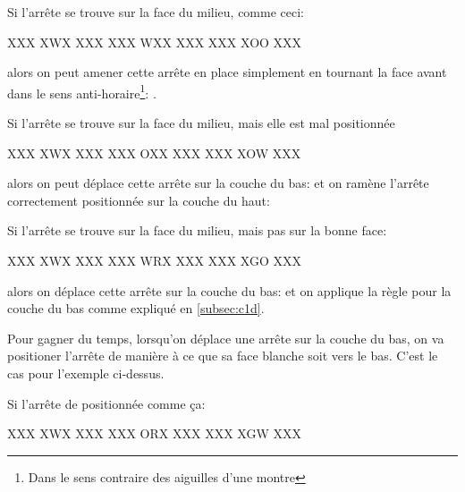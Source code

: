 \documentclass[10pt,paper=a5,pagesize]{scrbook}
\begin{document}
Si l'arrête se trouve sur la face du milieu, comme ceci:

\begin{center}
	\RubikFaceUp%
	{X}{X}{X}%
	{X}{W}{X}%
	{X}{X}{X}
	\RubikFaceRight%
	{X}{X}{X}%
	{W}{X}{X}%
	{X}{X}{X}
	\RubikFaceFront%
	{X}{X}{X}%
	{X}{O}{O}%
	{X}{X}{X}
\end{center}

alors on peut amener cette arrête en place simplement en tournant la face avant dans le sens anti-horaire\footnote{Dans le sens contraire des aiguilles d'une montre}: .

Si l'arrête se trouve sur la face du milieu, mais elle est mal positionnée

\begin{center}
	\RubikFaceUp%
	{X}{X}{X}%
	{X}{W}{X}%
	{X}{X}{X}
	\RubikFaceRight%
	{X}{X}{X}%
	{O}{X}{X}%
	{X}{X}{X}
	\RubikFaceFront%
	{X}{X}{X}%
	{X}{O}{W}%
	{X}{X}{X}
\end{center}

alors on peut déplace cette arrête sur la couche du bas:  et on ramène l'arrête correctement positionnée sur la couche du haut: 


Si l'arrête se trouve sur la face du milieu, mais pas sur la bonne face:

\begin{center}
	\RubikFaceUp%
	{X}{X}{X}%
	{X}{W}{X}%
	{X}{X}{X}
	\RubikFaceRight%
	{X}{X}{X}%
	{W}{R}{X}%
	{X}{X}{X}
	\RubikFaceFront%
	{X}{X}{X}%
	{X}{G}{O}%
	{X}{X}{X}
\end{center}

alors on déplace cette arrête sur la couche du bas:  et on applique la règle pour la couche du bas comme expliqué en \ref{subsec:c1d}.


Pour gagner du temps, lorsqu'on déplace une arrête sur la couche du bas, on va positioner l'arrête de manière à ce que sa face blanche soit vers le bas. C'est le cas pour l'exemple ci-dessus.

Si l'arrête de positionnée comme ça:

\begin{center}
	\RubikFaceUp%
	{X}{X}{X}%
	{X}{W}{X}%
	{X}{X}{X}
	\RubikFaceRight%
	{X}{X}{X}%
	{O}{R}{X}%
	{X}{X}{X}
	\RubikFaceFront%
	{X}{X}{X}%
	{X}{G}{W}%
	{X}{X}{X}
\end{center}
\end{document}
